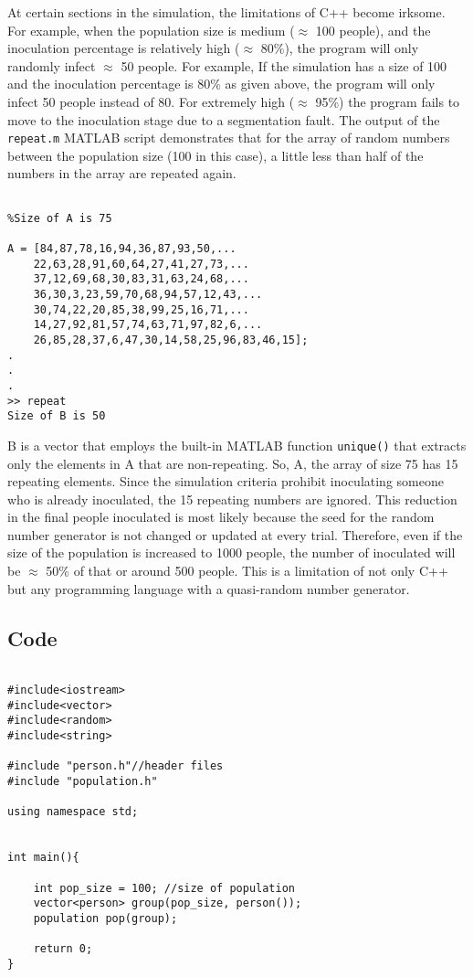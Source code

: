 \documentclass[paper=a4, fontsize=11pt]{scrartcl}
\begin{document}
At certain sections in the simulation, the limitations of C++ become irksome. For example, when the population size is medium ($\approx$ 100 people), and the inoculation percentage is relatively high ($\approx$ 80\%), the program will only randomly infect $\approx$ 50 people. For example, If the simulation has a size of 100 and the inoculation percentage is 80\% as given above, the program will only infect 50 people instead of 80. For extremely high ($\approx$ 95\%) the program fails to move to the inoculation stage due to a segmentation fault. The output of the \texttt{repeat.m} MATLAB script demonstrates that for the array of random numbers between the population size (100 in this case), a little less than half of the numbers in the array are repeated again.\\

\begin{verbatim}

%Size of A is 75

A = [84,87,78,16,94,36,87,93,50,...
    22,63,28,91,60,64,27,41,27,73,...
    37,12,69,68,30,83,31,63,24,68,...
    36,30,3,23,59,70,68,94,57,12,43,...
    30,74,22,20,85,38,99,25,16,71,...
    14,27,92,81,57,74,63,71,97,82,6,...
    26,85,28,37,6,47,30,14,58,25,96,83,46,15];
.
.
.
>> repeat
Size of B is 50

\end{verbatim}


B is a vector that employs the built-in MATLAB function \texttt{unique()} that extracts only the elements in A that are non-repeating. So, A, the array of size 75 has 15 repeating elements. Since the simulation criteria prohibit inoculating someone who is already inoculated, the 15 repeating numbers are ignored. This reduction in the final people inoculated is most likely because the seed for the random number generator is not changed or updated at every trial. Therefore, even if the size of the population is increased to 1000 people, the number of inoculated will be $\approx$ 50\% of that or around 500 people. This is a limitation of not only C++ but any programming language with a quasi-random number generator.\\

\subsection{Code}
\begin{lstlisting}

#include<iostream>
#include<vector>
#include<random>
#include<string>

#include "person.h"//header files
#include "population.h"

using namespace std;


int main(){

    int pop_size = 100; //size of population
    vector<person> group(pop_size, person());
    population pop(group);

    return 0;
}
\end{lstlisting}
\end{document}
